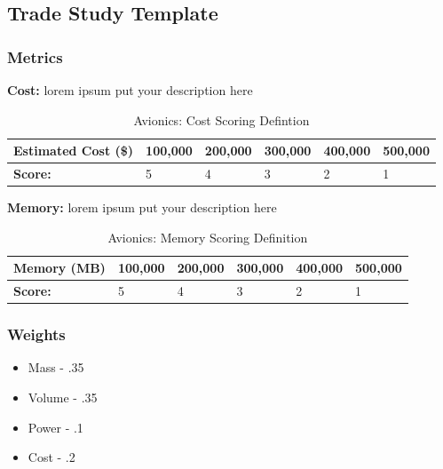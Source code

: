 \subsection{Trade Study Template}
\subsubsection{Metrics}
\textbf{Cost:} lorem ipsum put your description here
\begin{table}[H]
\centering
\begin{tabular}{|l|l|l|l|l|l|} 
\hline
    \textbf{Estimated Cost (\$) } & 100,000 & 200,000 & 300,000 & 400,000 & 500,000
    \\
\hline
    \textbf{Score:} & 5 & 4 & 3 & 2 & 1
    \\
\hline
\end{tabular}
\caption{Avionics: Cost Scoring Defintion \cite{Boain}}
\label{tbl:avioniccost}
\end{table}

\textbf{Memory:} lorem ipsum put your description here
\begin{table}[H]
\centering
\begin{tabular}{|l|l|l|l|l|l|} 
\hline
    \textbf{Memory (MB) } & 100,000 & 200,000 & 300,000 & 400,000 & 500,000
    \\
\hline
    \textbf{Score:} & 5 & 4 & 3 & 2 & 1
    \\
\hline
\end{tabular}
\caption{Avionics: Memory Scoring Definition \cite{Boain}}
\label{tbl:avionicsmemory}
\end{table}

\subsubsection{Weights}

\begin{itemize}
    \item Mass - .35
    \item Volume - .35
    \item Power - .1
    \item Cost - .2
\end{itemize}

